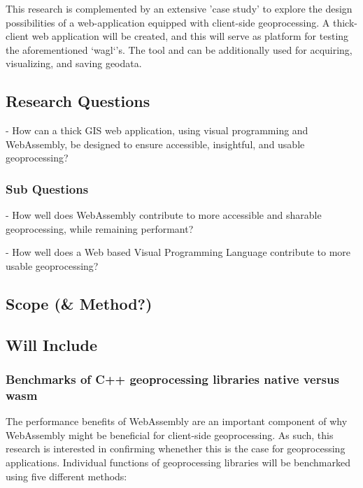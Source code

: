 This research is complemented by an extensive 'case study' to explore the design possibilities of a web-application equipped with client-side geoprocessing. 
A thick-client web application will be created, and this will serve as platform for testing the aforementioned `wagl`'s. 
The tool and can be additionally used for acquiring, visualizing, and saving geodata. 


\subsection{Research Questions}

- How can a thick GIS web application, using visual programming and WebAssembly, be designed to ensure accessible, insightful, and usable geoprocessing?

\subsubsection*{Sub Questions}

- How well does WebAssembly contribute to more accessible and sharable geoprocessing, while remaining performant? 

- How well does a Web based Visual Programming Language contribute to more usable geoprocessing?


\newpage
\subsection{Scope (\& Method?)}


\subsection*{Will Include}

\subsubsection*{Benchmarks of C++ geoprocessing libraries native versus wasm}

The performance benefits of WebAssembly are an important component of why WebAssembly might be beneficial for client-side geoprocessing. As such, this research is interested in confirming whenether this is the case for geoprocessing applications. Individual functions of geoprocessing libraries will be benchmarked using five different methods: 


